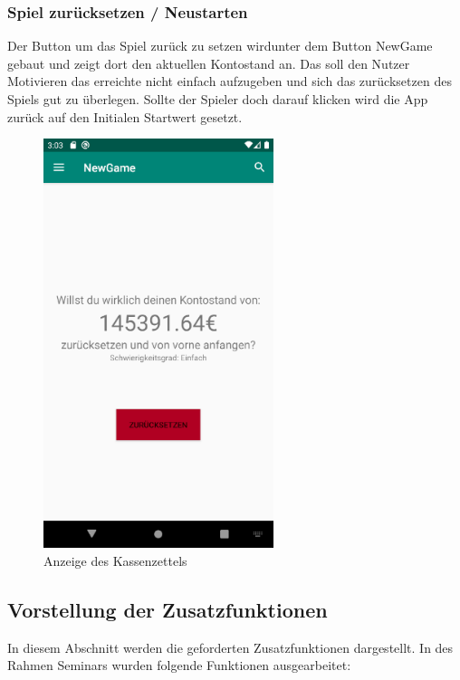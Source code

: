 \documentclass[10pt]{scrartcl}
\begin{document}
\subsubsection{Spiel zurücksetzen / Neustarten}
Der Button um das Spiel zurück zu setzen wirdunter dem Button NewGame gebaut und zeigt dort den aktuellen Kontostand an. Das soll den Nutzer Motivieren das erreichte nicht einfach aufzugeben und sich das zurücksetzen des Spiels gut zu überlegen. Sollte der Spieler doch darauf klicken wird die App zurück auf den Initialen Startwert gesetzt.

\begin{figure}[H]
	\centering
	\includegraphics[width=0.6\textwidth]{Bilder/Prsi/newGame.png}
	\caption{Anzeige des Kassenzettels}
\end{figure}

\subsection{Vorstellung der Zusatzfunktionen}
In diesem Abschnitt werden die geforderten Zusatzfunktionen dargestellt. In des Rahmen Seminars wurden folgende Funktionen ausgearbeitet:
	
	
\end{document}
